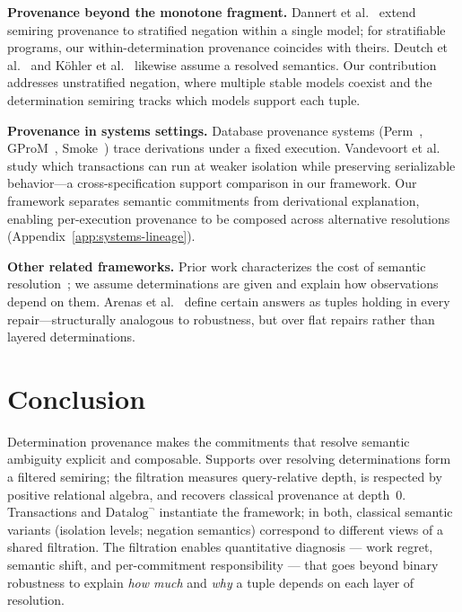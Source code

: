 \documentclass[acmsmall,review,anonymous]{acmart}
\theoremstyle{remark}
\numberwithin{definition}{section}
\numberwithin{theorem}{section}
\numberwithin{lemma}{section}
\numberwithin{corollary}{section}
\numberwithin{remark}{section}
\numberwithin{example}{section}
\numberwithin{observation}{section}
\numberwithin{assumption}{section}
\begin{document}
\smallskip
\noindent\textbf{Provenance beyond the monotone fragment.}
Dannert et al.~\cite{dannert2021semiring} extend semiring provenance to
stratified negation within a single model; for stratifiable programs,
our within-determination provenance coincides with theirs.
Deutch et al.~\cite{deutch2014circuits} and
Köhler et al.~\cite{kohler2012declarative} likewise assume a resolved
semantics.
Our contribution addresses unstratified negation, where multiple stable
models coexist and the determination semiring tracks which models
support each tuple.

\smallskip
\noindent\textbf{Provenance in systems settings.}
Database provenance systems (Perm~\cite{glavic2008perm},
GProM~\cite{arab2018gpromprovenance},
Smoke~\cite{psallidas2018smoke}) trace derivations under a fixed
execution.
Vandevoort et al.~\cite{vandevoort2025mixed} study which transactions can
run at weaker isolation while preserving serializable behavior---a
cross-specification support comparison in our framework.
Our framework separates semantic commitments from derivational explanation,
enabling per-execution provenance to be composed across alternative
resolutions (Appendix~\ref{app:systems-lineage}).

\smallskip
\noindent\textbf{Other related frameworks.}
Prior work characterizes the cost of
semantic resolution~\cite{anon2026complexity}; we assume determinations are given and explain how
observations depend on them.
Arenas et al.~\cite{arenas1999consistent} define certain answers as
tuples holding in every repair---structurally analogous to robustness,
but over flat repairs rather than layered determinations.

\section{Conclusion}
\label{sec:conclusion}

Determination provenance makes the commitments that resolve semantic
ambiguity explicit and composable.
Supports over resolving determinations form a filtered semiring;
the filtration measures query-relative depth, is respected by positive
relational algebra, and recovers classical provenance at depth~$0$.
Transactions and $\mbox{Datalog}^\neg$ instantiate the framework;
in both, classical semantic variants (isolation levels; negation
semantics) correspond to different views of a shared filtration.
The filtration enables quantitative diagnosis --- work regret,
semantic shift, and per-commitment responsibility --- that goes beyond
binary robustness to explain \emph{how much} and \emph{why} a tuple
depends on each layer of resolution.
\end{document}
